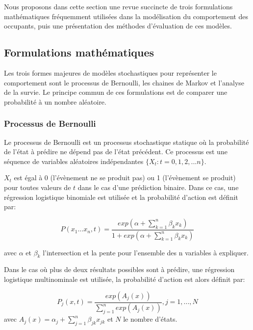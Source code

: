 Nous proposons dans cette section une revue succincte de trois formulations mathématiques fréquemment utilisées dans la modélisation du comportement des occupants, puis une présentation des méthodes d'évaluation de ces modèles.

\subsection{Formulations mathématiques}
\label{Formulations mathématiques}

Les trois formes majeures de modèles stochastiques pour représenter le comportement sont le processus de Bernoulli, les chaines de Markov et l'analyse de la survie. Le principe commun de ces formulations est de comparer une probabilité à un nombre aléatoire.

\subsubsection{Processus de Bernoulli}

Le processus de Bernoulli est un processus stochastique statique où la probabilité de l'état à prédire ne dépend pas de l'état précédent. Ce processus est une séquence de variables aléatoires indépendantes $\lbrace X_{t}:t=0,1,2,...n\rbrace$.  

$X_{t}$ est égal à 0 (l'évènement ne se produit pas) ou 1 (l'évènement se produit) pour toutes valeurs de $t$ dans le cas d'une prédiction binaire. Dans ce cas, une régression logistique binomiale est utilisée et la probabilité d'action est définit par:

\begin{equation}
P(x_{1}...x_{n}, t)=\frac{exp\left( \alpha + \sum\limits_{k=1}^n \beta_{k}x_{k}\right)}{1+exp\left( \alpha + \sum\limits_{k=1}^n \beta_{k}x_{k}\right)}
\end{equation}

avec $\alpha$ et $\beta_{k}$ l'intersection et la pente pour l'ensemble des n variables à expliquer.

Dans le cas où plus de deux résultats possibles sont à prédire, une régression logistique multinominale est utilisée, la probabilité d'action est alors définit par:

\begin{equation}
P_{j}(x, t)=\frac{exp (A_{j}(x))}{\sum\limits_{j=1}^n exp (A_{j}(x))}, j= 1, ..., N
\end{equation}
avec $A_{j}(x) = \alpha_{j} + \sum\limits_{j=1}^n \beta_{jk}x_{jk}$ et $N$ le nombre d'états.

